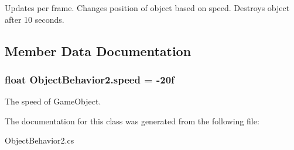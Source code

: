Updates per frame. Changes position of object based on speed. Destroys object after 10 seconds. 



\subsection{Member Data Documentation}
\hypertarget{classObjectBehavior2_a71c5a332d63c4fc276f53480f86f0641}{
\subsubsection[{speed}]{\setlength{\rightskip}{0pt plus 5cm}float Object\-Behavior2.\-speed = -\/20f}}\label{classObjectBehavior2_a71c5a332d63c4fc276f53480f86f0641}


The speed of Game\-Object. 



The documentation for this class was generated from the following file\-:\begin{DoxyCompactItemize}
\item 
Object\-Behavior2.\-cs\end{DoxyCompactItemize}
